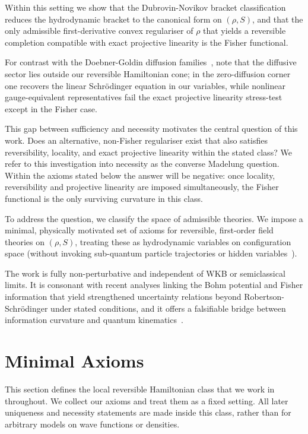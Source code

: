 \documentclass[11pt,a4paper]{article}
\numberwithin{equation}{section}
\theoremstyle{thmcompact}
\theoremstyle{remark}
\begin{document}
Within this setting we show that the Dubrovin-Novikov bracket classification reduces the hydrodynamic bracket to the canonical form on $(\rho,S)$, and that the only admissible first-derivative convex regulariser of $\rho$ that yields a reversible completion compatible with exact projective linearity is the Fisher functional.

For contrast with the Doebner-Goldin diffusion families~\cite{doebner1992,doebner1996}, note that the diffusive sector lies outside our reversible Hamiltonian cone; in the zero-diffusion corner one recovers the linear Schrödinger equation in our variables, while nonlinear gauge-equivalent representatives fail the exact projective linearity stress-test except in the Fisher case.

This gap between sufficiency and necessity motivates the central question of this work. Does an alternative, non-Fisher regulariser exist that also satisfies reversibility, locality, and exact projective linearity within the stated class? We refer to this investigation into necessity as the converse Madelung question. Within the axioms stated below the answer will be negative: once locality, reversibility and projective linearity are imposed simultaneously, the Fisher functional is the only surviving curvature in this class.

To address the question, we classify the space of admissible theories. We impose a minimal, physically motivated set of axioms for reversible, first-order field theories on $(\rho,S)$, treating these as hydrodynamic variables on configuration space (without invoking sub-quantum particle trajectories or hidden variables~\cite{holland1993}).

The work is fully non-perturbative and independent of WKB or semiclassical limits. It is consonant with recent analyses linking the Bohm potential and Fisher information that yield strengthened uncertainty relations beyond Robertson-Schrödinger under stated conditions, and it offers a falsifiable bridge between information curvature and quantum kinematics~\cite{bloch2022}.
	
\section{Minimal Axioms}
\label{sec:axioms}
This section defines the local reversible Hamiltonian class that we work in throughout. We collect our axioms and treat them as a fixed setting. All later uniqueness and necessity statements are made inside this class, rather than for arbitrary models on wave functions or densities.
\end{document}
